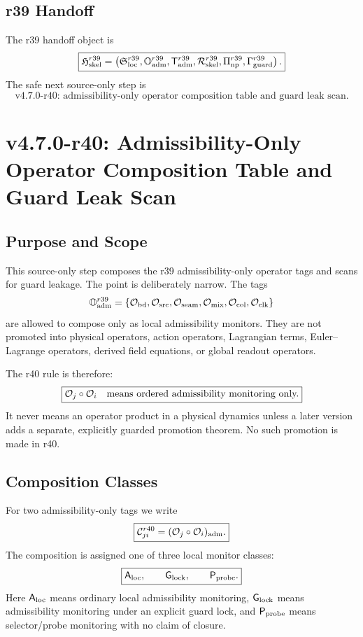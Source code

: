 \subsection{r39 Handoff}
\label{subsec:r39-handoff}

The r39 handoff object is
\[
\boxed{
\mathfrak H_{\rm skel}^{r39}
=
\left(
\mathfrak S_{\rm loc}^{r39},
\mathbb O_{\rm adm}^{r39},
\mathsf T_{\rm adm}^{r39},
\mathcal R_{\rm skel}^{r39},
\Pi_{\rm np}^{r39},
\Gamma_{\rm guard}^{r39}
\right).
}
\]
The safe next source-only step is
\[
\boxed{
\text{v4.7.0-r40: admissibility-only operator composition table and guard leak scan.}
}
\]



\section{v4.7.0-r40: Admissibility-Only Operator Composition Table and Guard Leak Scan}
\label{sec:v4-7-0-r40-operator-composition-guard-leak}

\subsection{Purpose and Scope}
\label{subsec:r40-purpose-scope}

This source-only step composes the r39 admissibility-only operator tags and scans
for guard leakage.  The point is deliberately narrow.  The tags
\[
\mathbb O_{\rm adm}^{r39}
=
\{
\mathcal O_{\rm bd},
\mathcal O_{\rm src},
\mathcal O_{\rm seam},
\mathcal O_{\rm mix},
\mathcal O_{\rm col},
\mathcal O_{\rm clk}
\}
\]
are allowed to compose only as local admissibility monitors.  They are not
promoted into physical operators, action operators, Lagrangian terms,
Euler--Lagrange operators, derived field equations, or global readout operators.

The r40 rule is therefore:
\[
\boxed{
\mathcal O_j\circ\mathcal O_i
\quad\hbox{means ordered admissibility monitoring only.}
}
\]
It never means an operator product in a physical dynamics unless a later version
adds a separate, explicitly guarded promotion theorem.  No such promotion is made
in r40.

\subsection{Composition Classes}
\label{subsec:r40-composition-classes}

For two admissibility-only tags we write
\[
\boxed{
\mathcal C_{ji}^{r40}
=
(\mathcal O_j\circ\mathcal O_i)_{\rm adm}.
}
\]
The composition is assigned one of three local monitor classes:
\[
\boxed{
\mathsf A_{\rm loc},\qquad
\mathsf G_{\rm lock},
\qquad
\mathsf P_{\rm probe}.
}
\]
Here \(\mathsf A_{\rm loc}\) means ordinary local admissibility monitoring,
\(\mathsf G_{\rm lock}\) means admissibility monitoring under an explicit guard
lock, and \(\mathsf P_{\rm probe}\) means selector/probe monitoring with no
claim of closure.

